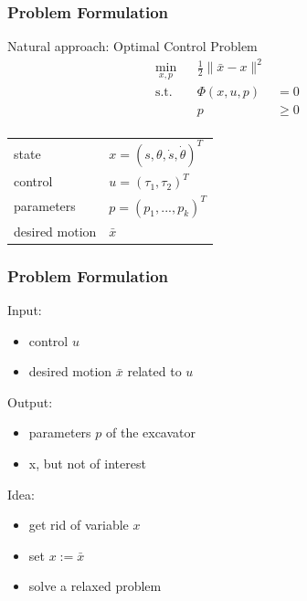\begin{frame}
    \frametitle{Problem Formulation}
    Natural approach: Optimal Control Problem
    \begin{align*}
        \min_{x,p} & & \frac{1}{2} \| \bar{x} - x \|^2 & & \\
        \operatorname{s.t.} & & \Phi(x,u,p) & = 0 & & \\
                            & & p & \geq 0 & & \\
    \end{align*}

    \begin{tabular}{ll}
        state & $ x = (s,\theta,\dot{s},\dot{\theta})^T $ \\
        control & $ u = (\tau_1,\tau_2)^T $ \\
        parameters & $ p = (p_1,...,p_k)^T $ \\
        desired motion & $\bar{x}$ \\
    \end{tabular}
\end{frame}

\begin{frame}
    \frametitle{Problem Formulation}
    Input:
    \begin{itemize}
        \item{control $u$}
        \item{desired motion $\bar{x}$ related to $u$}
    \end{itemize}

    Output:
    \begin{itemize}
        \item{parameters $p$ of the excavator}
        \item{x, but not of interest}
    \end{itemize}

    Idea:
    \begin{itemize}
        \item{get rid of variable $x$}
        \item{set $x := \bar{x}$}
        \item{solve a relaxed problem}
    \end{itemize}
\end{frame}

